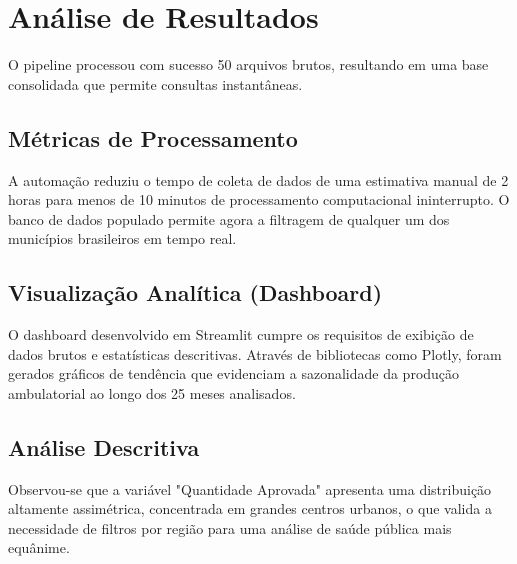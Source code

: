 ﻿\section{Análise de Resultados}
O pipeline processou com sucesso 50 arquivos brutos, resultando em uma base consolidada que permite consultas instantâneas.

\subsection{Métricas de Processamento}
A automação reduziu o tempo de coleta de dados de uma estimativa manual de 2 horas para menos de 10 minutos de processamento computacional ininterrupto. O banco de dados populado permite agora a filtragem de qualquer um dos municípios brasileiros em tempo real.

\subsection{Visualização Analítica (Dashboard)}
O dashboard desenvolvido em Streamlit cumpre os requisitos de exibição de dados brutos e estatísticas descritivas. Através de bibliotecas como Plotly, foram gerados gráficos de tendência que evidenciam a sazonalidade da produção ambulatorial ao longo dos 25 meses analisados.

\subsection{Análise Descritiva}
Observou-se que a variável "Quantidade Aprovada" apresenta uma distribuição altamente assimétrica, concentrada em grandes centros urbanos, o que valida a necessidade de filtros por região para uma análise de saúde pública mais equânime.
